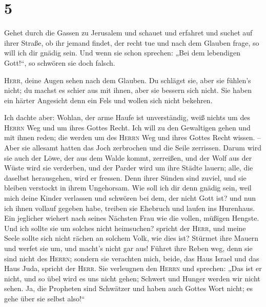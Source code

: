 \hypertarget{section-4}{%
\section{5}\label{section-4}}

 Gehet durch die Gassen zu Jerusalem und schauet und
erfahret und suchet auf ihrer Straße, ob ihr jemand findet, der recht
tue und nach dem Glauben frage, so will ich dir gnädig sein.
 Und wenn sie schon sprechen: „Bei dem lebendigen
Gott!{}``, so schwören sie doch falsch.

 \textsc{Herr}, deine Augen sehen nach dem Glauben. Du
schlägst sie, aber sie fühlen's nicht; du machst es schier aus mit
ihnen, aber sie bessern sich nicht. Sie haben ein härter Angesicht denn
ein Fels und wollen sich nicht bekehren.

 Ich dachte aber: Wohlan, der arme Haufe ist unverständig,
weiß nichts um des \textsc{Herrn} Weg und um ihres Gottes Recht.
 Ich will zu den Gewaltigen gehen und mit ihnen reden; die
werden um des \textsc{Herrn} Weg und ihres Gottes Recht wissen. -- Aber
sie allesamt hatten das Joch zerbrochen und die Seile zerrissen.
 Darum wird sie auch der Löwe, der aus dem Walde kommt,
zerreißen, und der Wolf aus der Wüste wird sie verderben, und der Parder
wird um ihre Städte lauern; alle, die daselbst herausgehen, wird er
fressen. Denn ihrer Sünden sind zuviel, und sie bleiben verstockt in
ihrem Ungehorsam.  Wie soll ich dir denn gnädig sein, weil
mich deine Kinder verlassen und schwören bei dem, der nicht Gott ist?
und nun ich ihnen vollauf gegeben habe, treiben sie Ehebruch und laufen
ins Hurenhaus.  Ein jeglicher wiehert nach seines Nächsten
Frau wie die vollen, müßigen Hengste.  Und ich sollte sie
um solches nicht heimsuchen? spricht der \textsc{Herr}, und meine Seele
sollte sich nicht rächen an solchem Volk, wie dies ist? 
Stürmet ihre Mauern und werfet sie um, und macht's nicht gar aus! Führet
ihre Reben weg, denn sie sind nicht des \textsc{Herrn}; 
sondern sie verachten mich, beide, das Haus Israel und das Haus Juda,
spricht der \textsc{Herr}.  Sie verleugnen den
\textsc{Herrn} und sprechen: „Das ist er nicht, und so übel wird es uns
nicht gehen; Schwert und Hunger werden wir nicht sehen. 
Ja, die Propheten sind Schwätzer und haben auch Gottes Wort nicht; es
gehe über sie selbst also!{}``

